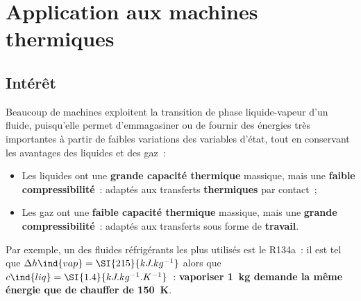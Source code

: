 \documentclass[../../main/main.tex]{subfiles}
\begin{document}
\section{Application aux machines thermiques}
\subsection{Intérêt}

Beaucoup de machines exploitent la transition de phase liquide-vapeur d'un
fluide, puisqu'elle permet d'emmagasiner ou de fournir des énergies très
importantes à partir de faibles variations des variables d'état, tout en
conservant les avantages des liquides et des gaz~:
\begin{itemize}
	\item Les liquides ont une \textbf{grande capacité thermique} massique, mais
	      une \textbf{faible compressibilité}~: adaptés aux transferts
	      \textbf{thermiques} par contact~;
	\item Les gaz ont une \textbf{faible capacité thermique} massique, mais une
	      \textbf{grande compressibilité}~: adaptés aux transferts sous forme de
	      \textbf{travail}.
\end{itemize}
Par exemple, un des fluides réfrigérants les plus utilisés est le
R134a~: il est tel que $\Delta{h}\ind{vap} =
	\SI{215}{kJ.kg^{-1}}$ alors que $c\ind{liq} = \SI{1.4}{kJ.kg^{-1}.K^{-1}}$~:
\textbf{vaporiser \SI{1}{kg} demande la même énergie que de chauffer de
	\SI{150}{K}}.
\end{document}
